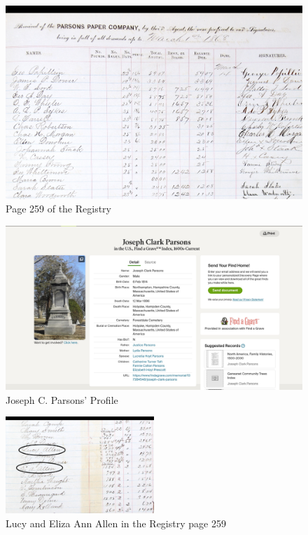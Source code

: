 \documentclass[
  letterpaper,
  DIV=11,
  numbers=noendperiod]{scrartcl}
\begin{document}
\begin{figure}

{\centering \includegraphics[width=\textwidth,height=0.47\textheight]{Registry_page_header.jpeg}

}

\caption{\label{fig-sample}Page 259 of the Registry}

\end{figure}

\begin{figure}

{\centering \includegraphics[width=\textwidth,height=0.4\textheight]{Joseph_Clark.jpeg}

}

\caption{\label{fig-sample8}Joseph C. Parsons' Profile}

\end{figure}

\begin{figure}

{\centering \includegraphics[width=0.5\textwidth,height=\textheight]{Mary and Eliza Allen.jpeg}

}

\caption{\label{fig-sample4}Lucy and Eliza Ann Allen in the Registry
page 259}

\end{figure}
\end{document}
